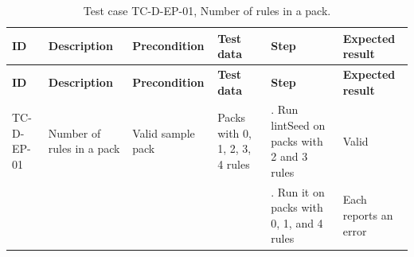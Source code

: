 {\footnotesize{}\renewcommand{\arraystretch}{1.1}
\begin{longtable}{|>{\raggedright\arraybackslash}p{}|>{\raggedright\arraybackslash}p{}|>{\raggedright\arraybackslash}p{}|>{\raggedright\arraybackslash}p{}|>{\raggedright\arraybackslash}p{}|>{\raggedright\arraybackslash}p{}|}
\caption{Test case TC-D-EP-01, Number of rules in a pack.} \\
\hline
\textbf{ID} & \textbf{Description} & \textbf{Precondition} & \textbf{Test data} & \textbf{Step} & \textbf{Expected result} \\ \hline
\endfirsthead
\hline
\textbf{ID} & \textbf{Description} & \textbf{Precondition} & \textbf{Test data} & \textbf{Step} & \textbf{Expected result} \\ \hline
\endhead
TC-D-EP-01 & Number of rules in a pack & Valid sample pack & Packs with 0, 1, 2, 3, 4 rules & 1. Run lintSeed on packs with 2 and 3 rules & Valid \\ \cline{5-6}
 &  &  &  & 2. Run it on packs with 0, 1, and 4 rules & Each reports an error \\ \hline
\end{longtable}
}

